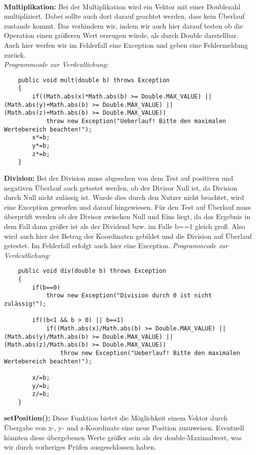 \documentclass[a4paper,11pt]{scrartcl}
\begin{document}
\\
\textbf{Multiplikation:} Bei der Multiplikation wird ein Vektor mit einer Doublezahl multipliziert. Dabei sollte auch dort darauf geachtet werden, dass kein Überlauf zustande kommt. Das verhindern wir, indem wir auch hier darauf testen ob die Operation einen größeren Wert erzeugen würde, als durch Double darstellbar. Auch hier werfen wir im Fehlerfall eine Exception und geben eine Fehlermeldung zurück.\\
\textit{Programmcode zur Verdeutlichung:}
\begin{lstlisting}
	public void mult(double b) throws Exception
	{
		if((Math.abs(x)*Math.abs(b) >= Double.MAX_VALUE) || (Math.abs(y)+Math.abs(b) >= Double.MAX_VALUE) || (Math.abs(z)+Math.abs(b) >= Double.MAX_VALUE))
			throw new Exception("Ueberlauf! Bitte den maximalen Wertebereich beachten!");
		x*=b;
		y*=b;
		z*=b;
	}
\end{lstlisting} $\;$ \\
\textbf{Division:} Bei der Division muss abgesehen von dem Test auf positiven und negativen Überlauf auch getestet werden, ob der Divisor Null ist, da Division durch Null nicht zulässig ist. Wurde dies durch den Nutzer nicht beachtet, wird eine Exception geworfen und darauf hingewiesen.
Für den Test auf Überlauf muss überprüft werden ob der Divisor zwischen Null und Eins liegt, da das Ergebnis in dem Fall dann größer ist als der Dividend bzw. im Falle b==1 gleich groß. Also wird auch hier der Betrag der Koordinaten gebildet und die Division auf Überlauf getestet. Im Fehlerfall erfolgt auch hier eine Exception.
\textit{Programmcode zur Verdeutlichung:}
\begin{lstlisting}
	public void div(double b) throws Exception
	{
		if(b==0)
			throw new Exception("Division durch 0 ist nicht zulässig!");
		
		if((b<1 && b > 0) || b==1)
			if((Math.abs(x)/Math.abs(b) >= Double.MAX_VALUE) || (Math.abs(y)/Math.abs(b) >= Double.MAX_VALUE) || (Math.abs(z)/Math.abs(b) >= Double.MAX_VALUE))
				throw new Exception("Ueberlauf! Bitte den maximalen Wertebereich beachten!");
		
		x/=b;
		y/=b;
		z/=b;
	}
\end{lstlisting} $\;$ \\
\textbf{setPosition(): } Diese Funktion bietet die Möglichkeit einem Vektor durch Übergabe von x-, y- und z-Koordinate eine neue Position zuzuweisen. Eventuell könnten diese übergebenen Werte größer sein als der double-Maximalwert, was wir durch vorheriges Prüfen ausgeschlossen haben.\\
\end{document}
